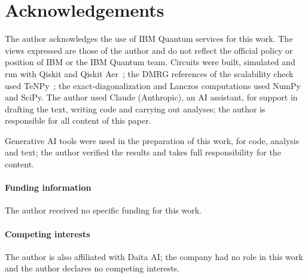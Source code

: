 \documentclass[submission, PhysCore]{SciPost}
\begin{document}
\FloatBarrier
\section*{Acknowledgements}
The author acknowledges the use of IBM Quantum services for this work. The views expressed are those of the author and do not reflect the official policy or position of IBM or the IBM Quantum team. Circuits were built, simulated and run with Qiskit and Qiskit Aer~\cite{Qiskit2024}; the DMRG references of the scalability check used TeNPy~\cite{TeNPy2024}; the exact-diagonalization and Lanczos computations used NumPy and SciPy. The author used Claude (Anthropic), an AI assistant, for support in drafting the text, writing code and carrying out analyses; the author is responsible for all content of this paper.

Generative AI tools were used in the preparation of this work, for code, analysis and text; the author verified the results and takes full responsibility for the content.

\paragraph{Funding information}
The author received no specific funding for this work.

\paragraph{Competing interests}
The author is also affiliated with Daita AI; the company had no role in this work and the author declares no competing interests.
\end{document}
